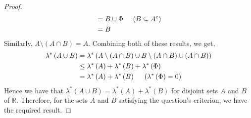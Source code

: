 \documentclass{article}
\theoremstyle{definition}
\theoremstyle{remark}
\theoremstyle{definition}
\theoremstyle{definition}
\theoremstyle{definition}
\newcommand{\union}{\cup}
\newcommand{\intrs}{\cap}
\newcommand{\R}{\mathbb{R}}
\newcommand{\comp}[1]{#1^{\text{c}}}
\newcommand{\lom}[1]{\lambda^*\left (#1\right )}
\begin{document}
\begin{enumerate}
{\begin{proof}
\begin{equation*}
\begin{split}
			 &= B \union \Phi \;\;\;\;\;\text{($ B\subseteq \comp{A} $)}\\
			 &= B
		\end{split}
	\end{equation*}
Similarly, $ A\setminus (A\intrs B) = A $. Combining both of these results, we get,
\begin{equation*}
	\begin{split}
		\lom{A\union B} &= \lom{A\setminus (A\intrs B) \union B\setminus (A\intrs B) \union (A\intrs B)}\\
		&\le \lom{A} + \lom{B} + \lom{\Phi}\\
		&= \lom{A} + \lom{B}\;\;\;\;\;\text{($ \lom{\Phi}= 0 $)}
	\end{split}
\end{equation*}
Hence we have that $ \lom{A\union B} = \lom{A} + \lom{B} $ for disjoint sets $ A $ and $B $ of $ \R $. Therefore, for the sets $ A $ and $ B $ satisfying the question's criterion, we have the required result.
 \end{proof}}
\end{enumerate}
\newpage
\end{document}
